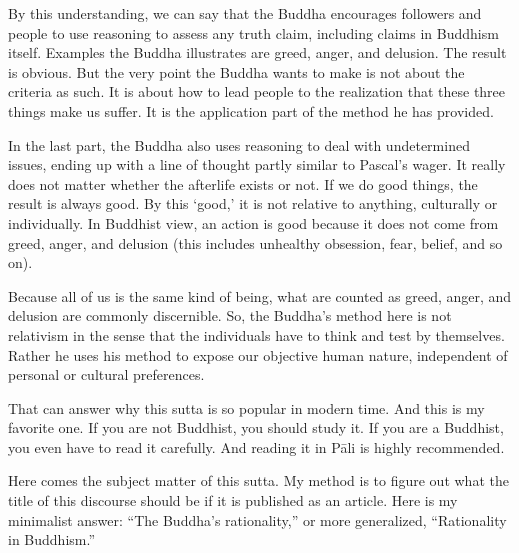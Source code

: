 By this understanding, we can say that the Buddha encourages followers and people to use reasoning to assess any truth claim, including claims in Buddhism itself. Examples the Buddha illustrates are greed, anger, and delusion. The result is obvious. But the very point the Buddha wants to make is not about the criteria as such. It is about how to lead people to the realization that these three things make us suffer. It is the application part of the method he has provided.

In the last part, the Buddha also uses reasoning to deal with undetermined issues, ending up with a line of thought partly similar to Pascal's wager. It really does not matter whether the afterlife exists or not. If we do good things, the result is always good. By this `good,' it is not relative to anything, culturally or individually. In Buddhist view, an action is good because it does not come from greed, anger, and delusion (this includes unhealthy obsession, fear, belief, and so on). 

Because all of us is the same kind of being, what are counted as greed, anger, and delusion are commonly discernible. So, the Buddha's method here is not relativism in the sense that the individuals have to think and test by themselves. Rather he uses his method to expose our objective human nature, independent of personal or cultural preferences.

That can answer why this sutta is so popular in modern time. And this is my favorite one. If you are not Buddhist, you should study it. If you are a Buddhist, you even have to read it carefully. And reading it in P\=ali is highly recommended.

Here comes the subject matter of this sutta. My method is to figure out what the title of this discourse should be if it is published as an article. Here is my minimalist answer: ``The Buddha's rationality,'' or more generalized, ``Rationality in Buddhism.''
